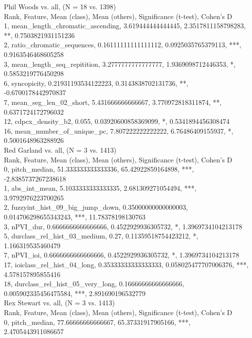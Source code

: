 Phil Woods vs. all, (N = 18 vs. 1398)\\
Rank, Feature, Mean (class), Mean (others), Significance (t-test), Cohen's D\\
1, mean_length_chromatic_ascending, 3.619444444444445, 2.3517811158798283, **, 0.7503821931151236\\
2, ratio_chromatic_sequences, 0.16111111111111112, 0.0925035765379113, ***, 0.9163546468605258\\
3, mean_length_seq_repitition, 3.2777777777777777, 1.9369098712446353, *, 0.5853219776450298\\
6, syncopicity, 0.21931193534122223, 0.3143838702131736, **, -0.6700178442970837\\
7, mean_seg_len_02_short, 5.431666666666667, 3.770972818311874, **, 0.6371724172796032\\
12, cdpcx_density_b2, 0.055, 0.03920600858369099, *, 0.5341894456308474\\
16, mean_number_of_unique_pc, 7.807222222222222, 6.76486409155937, *, 0.5001648963288926\\
Red Garland vs. all, (N = 3 vs. 1413)\\
Rank, Feature, Mean (class), Mean (others), Significance (t-test), Cohen's D\\
0, pitch_median, 51.333333333333336, 65.42922859164898, ***, -2.8385737267238618\\
1, abs_int_mean, 5.1033333333333335, 2.681309271054494, ***, 3.9792976223700265\\
2, fuzzyint_hist_09_big_jump_down, 0.35000000000000003, 0.014706298655343243, ***, 11.78378198130763\\
3, nPVI_dur, 0.6666666666666666, 0.4522929936305732, *, 1.3969734104213178\\
5, durclass_rel_hist_03_medium, 0.27, 0.11359518754423212, *, 1.166319535460479\\
7, nPVI_ioi, 0.6666666666666666, 0.4522929936305732, *, 1.3969734104213178\\
17, ioiclass_rel_hist_04_long, 0.35333333333333333, 0.058025477707006376, ***, 4.578157895855416\\
18, durclass_rel_hist_05_very_long, 0.16666666666666666, 0.005902335456475584, ***, 2.891690196532779\\
Rex Stewart vs. all, (N = 3 vs. 1413)\\
Rank, Feature, Mean (class), Mean (others), Significance (t-test), Cohen's D\\
0, pitch_median, 77.66666666666667, 65.37331917905166, ***, 2.4705443911086657\\
